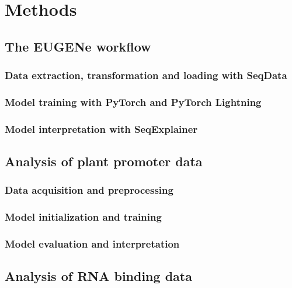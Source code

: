 \section{Methods}

\subsection{The EUGENe workflow}

\subsubsection{Data extraction, transformation and loading with SeqData}

\subsubsection{Model training with PyTorch and PyTorch Lightning}

\subsubsection{Model interpretation with SeqExplainer}

\subsection{Analysis of plant promoter data}

\subsubsection{Data acquisition and preprocessing}

\subsubsection{Model initialization and training}

\subsubsection{Model evaluation and interpretation}

\subsection{Analysis of RNA binding data}

